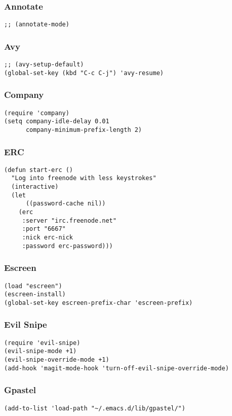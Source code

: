 \documentclass[11pt]{article}
\begin{document}
\subsubsection{Annotate}
\label{sec:orgced4498}
\begin{verbatim}
;; (annotate-mode)
\end{verbatim}
\subsubsection{Avy}
\label{sec:orgdfd0ae0}
\begin{verbatim}
;; (avy-setup-default)
(global-set-key (kbd "C-c C-j") 'avy-resume)
\end{verbatim}
\subsubsection{Company}
\label{sec:org863e4a0}
\begin{verbatim}
(require 'company)
(setq company-idle-delay 0.01
      company-minimum-prefix-length 2)
\end{verbatim}
\subsubsection{ERC}
\label{sec:org8ac470d}
\begin{verbatim}
(defun start-erc ()
  "Log into freenode with less keystrokes"
  (interactive)
  (let
      ((password-cache nil))
    (erc
     :server "irc.freenode.net"
     :port "6667"
     :nick erc-nick
     :password erc-password)))
\end{verbatim}
\subsubsection{Escreen}
\label{sec:org1e5946b}
\begin{verbatim}
(load "escreen")
(escreen-install)
(global-set-key escreen-prefix-char 'escreen-prefix)
\end{verbatim}
\subsubsection{Evil Snipe}
\label{sec:orga85d7e0}
\begin{verbatim}
(require 'evil-snipe)
(evil-snipe-mode +1)
(evil-snipe-override-mode +1)
(add-hook 'magit-mode-hook 'turn-off-evil-snipe-override-mode)
\end{verbatim}
\subsubsection{Gpastel}
\label{sec:orgdf2cf7d}
\begin{verbatim}
(add-to-list 'load-path "~/.emacs.d/lib/gpastel/")
\end{verbatim}
\end{document}
